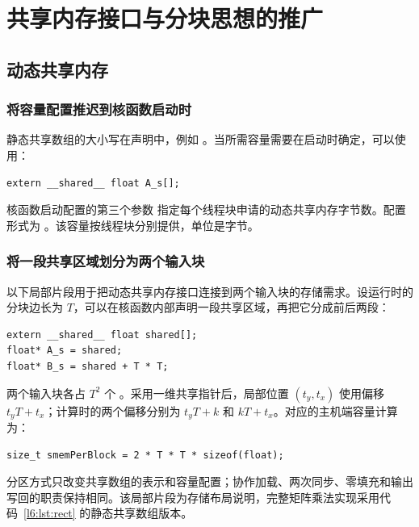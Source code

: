 \section{共享内存接口与分块思想的推广}

\subsection{动态共享内存}
\subsubsection{将容量配置推迟到核函数启动时}
\par\noindent\begin{minipage}{\linewidth}
静态共享数组的大小写在声明中，例如 。当所需容量需要在启动时确定，可以使用：

\begin{lstlisting}[numbers=none]
extern __shared__ float A_s[];
\end{lstlisting}
\end{minipage}\par
核函数启动配置的第三个参数  指定每个线程块申请的动态共享内存字节数。配置形式为 。该容量按线程块分别提供，单位是字节。

\subsubsection{将一段共享区域划分为两个输入块}
\par\noindent\begin{minipage}{\linewidth}
以下局部片段用于把动态共享内存接口连接到两个输入块的存储需求。设运行时的分块边长为 $T$，可以在核函数内部声明一段共享区域，再把它分成前后两段：

\begin{lstlisting}[numbers=none]
extern __shared__ float shared[];
float* A_s = shared;
float* B_s = shared + T * T;
\end{lstlisting}
\end{minipage}\par
\par\noindent\begin{minipage}{\linewidth}
两个输入块各占 $T^2$ 个 。采用一维共享指针后，局部位置 $(t_y,t_x)$ 使用偏移 $t_yT+t_x$；计算时的两个偏移分别为 $t_yT+k$ 和 $kT+t_x$。对应的主机端容量计算为：

\begin{lstlisting}[numbers=none]
size_t smemPerBlock = 2 * T * T * sizeof(float);
\end{lstlisting}
\end{minipage}\par
分区方式只改变共享数组的表示和容量配置；协作加载、两次同步、零填充和输出写回的职责保持相同。该局部片段为存储布局说明，完整矩阵乘法实现采用代码~\ref{l6:lst:rect} 的静态共享数组版本。

